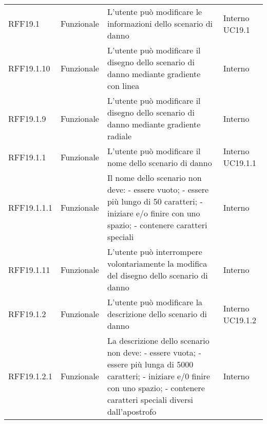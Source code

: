 \begin{longtable}{p{2cm}!{\VRule[1pt]}p{2cm}!{\VRule[1pt]}p{5cm}!{\VRule[1pt]}p{1.5cm}}
	\\
	RFF19.1                          & Funzionale\newline               & L'utente può modificare le informazioni dello scenario di danno                                                          & Interno \newline UC19.1      
	\\
	RFF19.1.10                       & Funzionale\newline               & L'utente può modificare il disegno dello scenario di danno mediante gradiente con linea                                  & Interno                      \\
	RFF19.1.9                        & Funzionale\newline               & L'utente può modificare il disegno dello scenario di danno mediante gradiente radiale                                    & Interno                      \\
	RFF19.1.1                        & Funzionale\newline               & L'utente può modificare il nome dello scenario di danno                                                                  & Interno \newline UC19.1.1    
	\\
	RFF19.1.1.1&Funzionale\newline  & Il nome dello scenario non deve:
	- essere vuoto; 
	- essere più lungo di 50 caratteri; 
	- iniziare e/o finire con uno spazio;
	- contenere caratteri speciali & Interno \\
	RFF19.1.11                       & Funzionale\newline               & L'utente può interrompere volontariamente la modifica del disegno dello scenario di danno                                & Interno                      \\
	RFF19.1.2                        & Funzionale\newline               & L'utente può modificare la descrizione dello scenario di danno                                                           & Interno \newline UC19.1.2    
	\\
	RFF19.1.2.1&Funzionale\newline  & La descrizione dello scenario non deve:
	- essere vuota;
	- essere più lunga di 5000 caratteri;
	- iniziare e/0 finire con uno spazio; 
	- contenere caratteri speciali diversi dall'apostrofo & Interno \\

\end{longtable}

